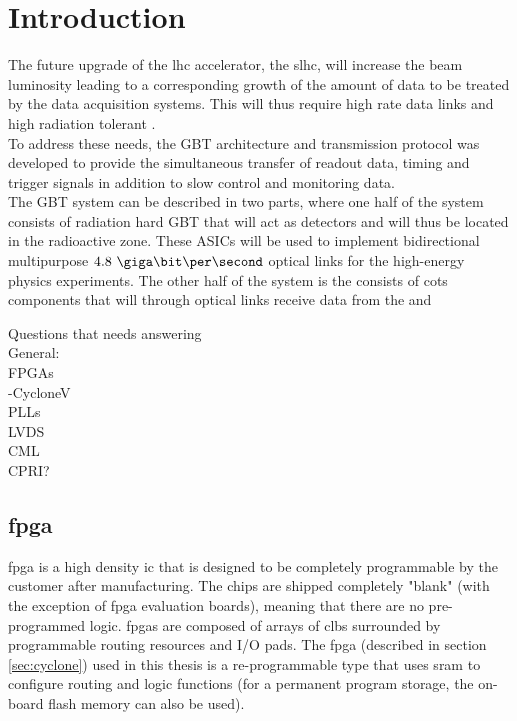 \documentclass[main.tex]{subfiles}
\begin{document}
\chapter{Introduction}

The future upgrade of the \gls{lhc} accelerator, the \gls{slhc}, will increase the beam luminosity leading to a corresponding growth of the amount of data to be treated by the data acquisition systems. This will thus require high rate data links and high radiation tolerant .\\
To address these needs, the GBT architecture and transmission protocol was developed to provide the simultaneous transfer of readout data, timing and trigger signals in addition to slow control and monitoring data. \\
The GBT system can be described in two parts, where one half of the system consists of radiation hard GBT  that will act as detectors and will thus be located in the radioactive zone. These ASICs will be used to implement bidirectional multipurpose $4.8\ \giga\bit\per\second$ optical links for the high-energy physics experiments. The other half of the system is the consists of \gls{cots} components that will through optical links receive data from the  and 


Questions that needs answering\\
General:\\
FPGAs\\
-CycloneV\\
PLLs\\
LVDS\\
CML\\
CPRI?\\

\section{\gls{fpga}}

\Gls{fpga} is a high density \gls{ic} that is designed to be completely programmable by the customer after manufacturing. The chips are shipped completely "blank" (with the exception of \gls{fpga} evaluation boards), meaning that there are no pre-programmed logic. \Glspl{fpga} are composed of arrays of \glspl{clb} surrounded by programmable routing resources and I/O pads. \cite{weste11} 
The \gls{fpga} (described in section \ref{sec:cyclone}) used in this thesis is a re-programmable type that uses \gls{sram} to configure routing and logic functions (for a permanent program storage, the on-board \gls{flash} memory can also be used).
\end{document}

